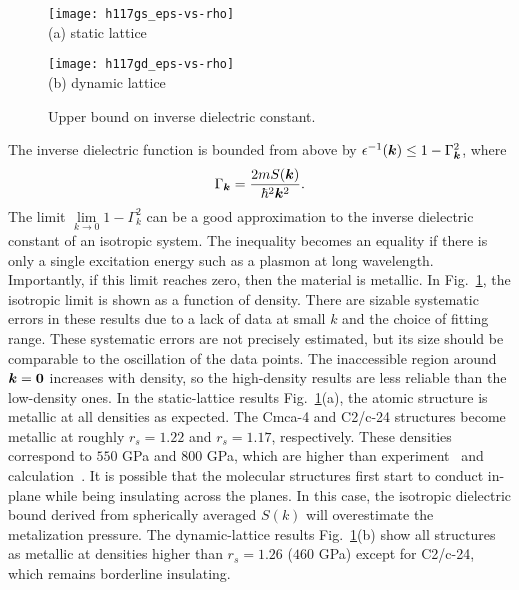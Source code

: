 \begin{figure}[h]
\centering
\begin{minipage}{0.49\textwidth}
\centering
\texttt{[image: h117gs\_eps-vs-rho]}\\
(a) static lattice
\end{minipage}
\begin{minipage}{0.49\textwidth}
\centering
\texttt{[image: h117gd\_eps-vs-rho]}\\
(b) dynamic lattice
\end{minipage}
\caption{Upper bound on inverse dielectric constant.}
\label{fig:hsolid-epsinv}
\end{figure}

The inverse dielectric function is bounded from above by $\epsilon^{-1}(\boldsymbol{k}) \le 1-\Gamma_{\boldsymbol{k}}^2$, where
\begin{align}
\Gamma_{\boldsymbol{k}} = \dfrac{2m S(\boldsymbol{k})}{\hbar^2 \boldsymbol{k}^2}.
\end{align}
The limit $\lim\limits_{k\rightarrow0} 1-\Gamma_k^2$ can be a good approximation to the inverse dielectric constant of an isotropic system.
The inequality becomes an equality if there is only a single excitation energy such as a plasmon at long wavelength.
Importantly, if this limit reaches zero, then the material is metallic.
In Fig.~\ref{fig:hsolid-epsinv}, the isotropic limit is shown as a function of density.
There are sizable systematic errors in these results due to a lack of data at small $k$ and the choice of fitting range.
These systematic errors are not precisely estimated, but its size should be comparable to the oscillation of the data points.
The inaccessible region around $\boldsymbol{k}=\boldsymbol{0}$ increases with density, so the high-density results are less reliable than the low-density ones.
In the static-lattice results Fig.~\ref{fig:hsolid-epsinv}(a), the atomic structure is metallic at all densities as expected.
The Cmca-4 and C2/c-24 structures become metallic at roughly $r_s=1.22$ and $r_s=1.17$, respectively. These densities correspond to $550$ GPa and $800$ GPa, which are higher than experiment~\cite{Loubeyre2020} and calculation~\cite{Gorelov2019}.
It is possible that the molecular structures first start to conduct in-plane while being insulating across the planes.
In this case, the isotropic dielectric bound derived from spherically averaged $S(k)$ will overestimate the metalization pressure.
The dynamic-lattice results Fig.~\ref{fig:hsolid-epsinv}(b) show all structures as metallic at densities higher than $r_s=1.26$ ($460$ GPa) except for C2/c-24, which remains borderline insulating.

